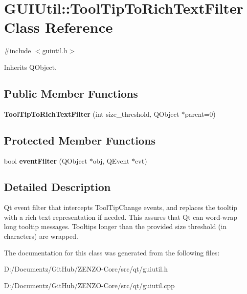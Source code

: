\hypertarget{class_g_u_i_util_1_1_tool_tip_to_rich_text_filter}{}\section{G\+U\+I\+Util\+::Tool\+Tip\+To\+Rich\+Text\+Filter Class Reference}
\label{class_g_u_i_util_1_1_tool_tip_to_rich_text_filter}


{\ttfamily \#include $<$guiutil.\+h$>$}



Inherits Q\+Object.

\subsection*{Public Member Functions}
\begin{DoxyCompactItemize}
\item 
\mbox{\label{class_g_u_i_util_1_1_tool_tip_to_rich_text_filter_abdb48682c8ec34a8f774813cd9449f0d}} 
{\bfseries Tool\+Tip\+To\+Rich\+Text\+Filter} (int size\+\_\+threshold, Q\+Object $\ast$parent=0)
\end{DoxyCompactItemize}
\subsection*{Protected Member Functions}
\begin{DoxyCompactItemize}
\item 
\mbox{\label{class_g_u_i_util_1_1_tool_tip_to_rich_text_filter_a5f4450d8b203f009a8bdc67d6d3f388c}} 
bool {\bfseries event\+Filter} (Q\+Object $\ast$obj, Q\+Event $\ast$evt)
\end{DoxyCompactItemize}


\subsection{Detailed Description}
Qt event filter that intercepts Tool\+Tip\+Change events, and replaces the tooltip with a rich text representation if needed. This assures that Qt can word-\/wrap long tooltip messages. Tooltips longer than the provided size threshold (in characters) are wrapped. 

The documentation for this class was generated from the following files\+:\begin{DoxyCompactItemize}
\item 
D\+:/\+Documentz/\+Git\+Hub/\+Z\+E\+N\+Z\+O-\/\+Core/src/qt/guiutil.\+h\item 
D\+:/\+Documentz/\+Git\+Hub/\+Z\+E\+N\+Z\+O-\/\+Core/src/qt/guiutil.\+cpp\end{DoxyCompactItemize}
